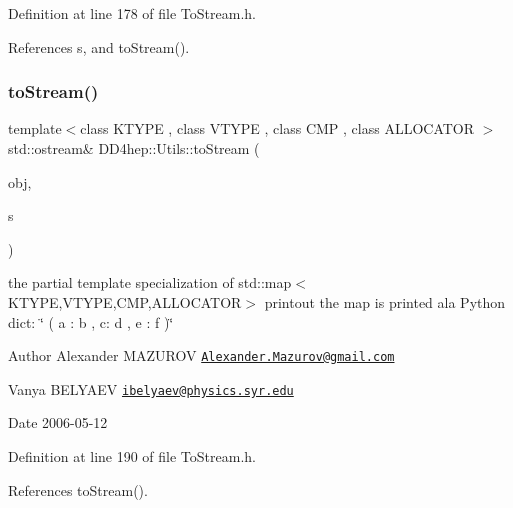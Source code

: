 Definition at line 178 of file To\+Stream.\+h.



References s, and to\+Stream().

\hypertarget{namespace_d_d4hep_1_1_utils_afe5b1089a2b4c65f34fc789456ad2fa7}{}\label{namespace_d_d4hep_1_1_utils_afe5b1089a2b4c65f34fc789456ad2fa7} 
\subsubsection{\texorpdfstring{to\+Stream()}{toStream()}\hspace{0.1cm}{\footnotesize\ttfamily [13/22]}}
{\footnotesize\ttfamily template$<$class K\+T\+Y\+PE , class V\+T\+Y\+PE , class C\+MP , class A\+L\+L\+O\+C\+A\+T\+OR $>$ \\
std\+::ostream\& D\+D4hep\+::\+Utils\+::to\+Stream (\begin{DoxyParamCaption}\item[{const std\+::map$<$ K\+T\+Y\+PE, V\+T\+Y\+PE, C\+MP, A\+L\+L\+O\+C\+A\+T\+OR $>$ \&}]{obj,  }\item[{std\+::ostream \&}]{s }\end{DoxyParamCaption})\hspace{0.3cm}{\ttfamily [inline]}}

the partial template specialization of {\ttfamily std\+::map$<$\+K\+T\+Y\+P\+E,\+V\+T\+Y\+P\+E,\+C\+M\+P,\+A\+L\+L\+O\+C\+A\+T\+O\+R$>$} printout the map is printed a\textquotesingle{}la Python dict\+: \char`\"{} ( a \+: b , c\+: d , e \+: f )\char`\"{} \begin{DoxyAuthor}{Author}
Alexander M\+A\+Z\+U\+R\+OV \href{mailto:Alexander.Mazurov@gmail.com}{\tt Alexander.\+Mazurov@gmail.\+com} 

Vanya B\+E\+L\+Y\+A\+EV \href{mailto:ibelyaev@physics.syr.edu}{\tt ibelyaev@physics.\+syr.\+edu} 
\end{DoxyAuthor}
\begin{DoxyDate}{Date}
2006-\/05-\/12 
\end{DoxyDate}


Definition at line 190 of file To\+Stream.\+h.



References to\+Stream().

\hypertarget{namespace_d_d4hep_1_1_utils_a12b3cc30e429682af25ebf60c4527ce2}{}\label{namespace_d_d4hep_1_1_utils_a12b3cc30e429682af25ebf60c4527ce2} 
